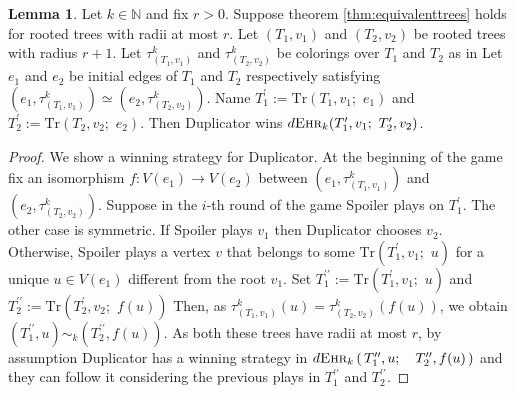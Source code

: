 \documentclass[12pt,notitlepage,a4paper]{article}
\theoremstyle{definition}
\newtheorem{lemma}{Lemma}[section]
\newcommand{\N}{\mathbb{N}}
\newcommand{\ehr}{\textsc{Ehr}}
\begin{document}
\begin{lemma} \label{lem:equivalentedges}
	Let $k\in \N$ and fix $r>0$. Suppose theorem \ref{thm:equivalenttrees}
	holds for rooted trees with radii at most $r$.
	Let $(T_1,v_1)$ and $(T_2,v_2)$ be rooted trees with radius
	$r+1$. Let $\tau^k_{(T_1,v_1)}$ and $\tau^k_{(T_2,v_2)}$
	be colorings over $T_1$ and $T_2$ as in 
	Let $e_1$ and $e_2$ be initial edges 
	of $T_1$ and $T_2$ respectively satisfying 
	$(e_1,\tau^k_{(T_1,v_1)})\simeq (e_2,\tau^k_{(T_2,v_2)})$. Name 
	$T^\prime_1:=\mathrm{Tr}(T_1,v_1; \,\,e_1)$ and 
	$T^\prime_2:=\mathrm{Tr}(T_2,v_2;\,\,e_2)$. Then
	Duplicator wins 
	$d\ehr_{k}(T^\prime_1, v_1; \, \, T^\prime_2,v_2)$.
\end{lemma}
\begin{proof}
	We show a winning strategy for Duplicator.
	At the beginning of the game fix an isomorphism 
	$f:V(e_1)\rightarrow V(e_2)$ between 
	$(e_1,\tau^k_{(T_1,v_1)})$
	and $(e_2,\tau^k_{(T_2,v_2)})$.
	Suppose in the $i$-th round of the game Spoiler
	plays on $T^\prime_1$. The other case is symmetric.
	If Spoiler plays $v_1$ then Duplicator chooses $v_2$. 
	Otherwise, Spoiler plays a vertex $v$ that belongs
	to some $\mathrm{Tr}(T^\prime_1,v_1;\,\, u)$ for a unique $u\in V(e_1)$
	different from the root $v_1$. 
	Set $T^{\prime\prime}_1:=
	\mathrm{Tr}\left(T^\prime_1,v_1;\,\, u\right)$
	and
	$T^{\prime\prime}_2:=\mathrm{Tr}\left(T^\prime_2,v_2;\,\, f(u)\right)$
	Then, as $\tau^k_{(T_1,v_1)}\left(u\right)=\tau^k_{(T_2,v_2)}\left(f(u)\right)$,
	we obtain
	$\left(T^{\prime\prime}_1,u\right) \sim_k 
	\left(T^{\prime \prime}_2,f(u)\right)$.
	As both these trees have radii at most $r$, 
	by assumption Duplicator has a winning 
	strategy in
	$d\ehr_{k}\left(\,T^{\prime\prime}_1, u;
	\quad T^{\prime \prime}_2, f(u)\,  \right)$		
	and they can follow it considering the previous plays in
	$T^{\prime\prime}_1$ and $T^{\prime\prime}_2$.	
\end{proof}
\end{document}
